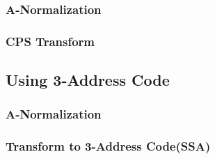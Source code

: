 \documentclass[a4paper,11pt]{jreport}
\begin{document}
\subsubsection{A-Normalization}
\subsubsection{CPS Transform}
\subsection{Using 3-Address Code}
\subsubsection{A-Normalization}
\subsubsection{Transform to 3-Address Code(SSA)}

\end{document}
